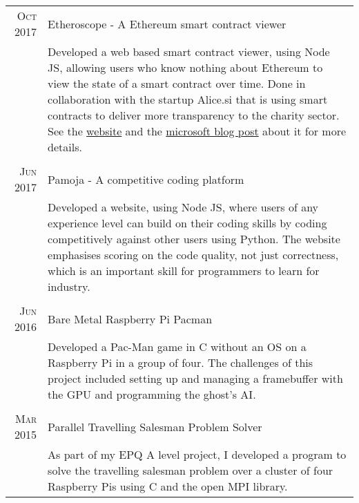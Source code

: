 \documentclass[a4paper,10pt]{article} %
\begin{document}
\begin{tabular}{r|p{15cm}}
\textsc{Oct 2017} & Etheroscope - A Ethereum smart contract viewer \\
& \footnotesize{Developed a web based smart contract viewer, using Node JS, allowing users who know nothing about Ethereum to view the state of a smart contract over time. Done in collaboration with the startup Alice.si that is using smart contracts to deliver more transparency to the charity sector. See the \href{http://etheroscope.alice.si/}{website} and the \href{https://blogs.msdn.microsoft.com/uk_faculty_connection/2018/02/19/etheroscope-a-smart-contract-visualiser/}{microsoft blog post} about it for more details.}\\
\multicolumn{2}{c}{} \\

\textsc{Jun 2017} & Pamoja - A competitive coding platform \\
& \footnotesize{Developed a website, using Node JS, where users of any experience level can build on their coding skills by coding competitively against other users using Python. The website emphasises scoring on the code quality, not just correctness, which is an important skill for programmers to learn for industry.} \\
\multicolumn{2}{c}{} \\

\textsc{Jun 2016} & Bare Metal Raspberry Pi Pacman\\
& \footnotesize{Developed a Pac-Man game in C without an OS on a Raspberry Pi in a group of four. The challenges of this project included setting up and managing a framebuffer with the GPU and programming the ghost's AI.} \\
\multicolumn{2}{c}{} \\

\textsc{Mar 2015} & Parallel Travelling Salesman Problem Solver\\
& \footnotesize{As part of my EPQ A level project, I developed a program to solve the travelling salesman problem over a cluster of four Raspberry Pis using C and the open MPI library. }
\end{tabular}
\end{document}

